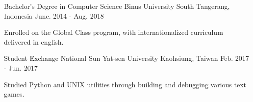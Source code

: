 

\begin{cventries}

  \cventry
  {Bachelor's Degree in Computer Science} %
  {Binus University} %
  {South Tangerang, Indonesia} %
  {June. 2014 - Aug. 2018} %
  {
    \begin{cvitems} %
      \item {Enrolled on the Global Class program, with internationalized curriculum delivered in english.}
    \end{cvitems}
  }

  \cventry
  {Student Exchange} %
  {National Sun Yat-sen University} %
  {Kaohsiung, Taiwan} %
  {Feb. 2017 - Jun. 2017} %
  {
    \begin{cvitems} %
      \item {Studied Python and UNIX utilities through building and debugging various text games.}
    \end{cvitems}
  }

\end{cventries}
